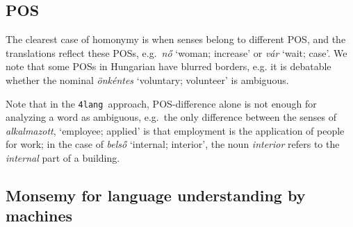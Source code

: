\documentclass[11pt]{article}
\newcommand{\fl}{\texttt{4lang}}
\begin{document}
\subsection{POS}

The clearest case of homonymy is when senses belong to different POS, and the
translations reflect these POSs, e.g.~\emph{nő} `woman; increase' or \emph{vár}
 `wait; case'.  We note that some POSs in Hungarian have
blurred borders, e.g.  it is debatable whether the nominal \emph{önkéntes}
`voluntary; volunteer' is ambiguous. 

Note that in the \fl~approach, POS-difference alone is not enough for
analyzing a word as ambiguous, e.g.~the only difference between the senses of
\emph{alkalmazott}, `employee; applied' is that employment is the application
of people for work; in the case of \emph{belső} `internal; interior', the noun
\emph{interior} refers to the \emph{internal} part of a building.

\subsection{Monsemy for language understanding by machines}



\todo{missing sense \\ édes [['sweetheart'], ['cute \\
  közvetlen [['informal'], ['casual}
\end{document}

